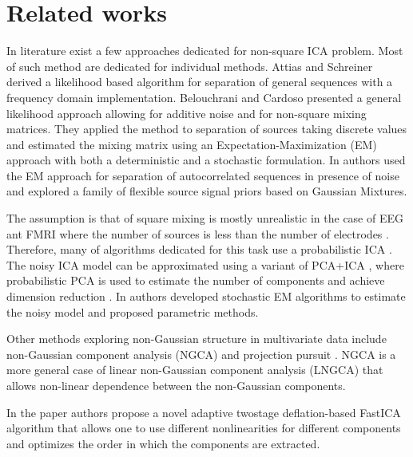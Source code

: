 \section{Related works}
\label{related_works}

In literature exist a few approaches dedicated for non-square ICA problem.
Most of such method are dedicated for individual methods.
Attias and Schreiner \cite{attias1997blind} derived a likelihood based algorithm for separation of general sequences with a frequency domain implementation.
Belouchrani and Cardoso \cite{belouchrani1995maximum} presented a general likelihood approach allowing
for additive noise and for non-square mixing matrices. They applied the
method to separation of sources taking discrete values and estimated the
mixing matrix using an Expectation-Maximization (EM) approach with both a deterministic and a stochastic formulation. In \cite{moulines1997maximum} authors used the EM approach
for separation of autocorrelated sequences in presence of noise and explored
a family of flexible source signal priors based on Gaussian Mixtures. 

The assumption is that of square mixing is mostly unrealistic in  the case of EEG ant FMRI where the number of sources is less than the number of electrodes \cite{beckmann2004probabilistic,samarov2004nonparametric,shi2017investigating}. Therefore, many of algorithms dedicated for this task use a probabilistic ICA \cite{tipping1999probabilistic}.
The noisy ICA model can be approximated using a variant of PCA+ICA \cite{beckmann2004probabilistic}, where probabilistic PCA is used to estimate the number of components and achieve dimension reduction \cite{tipping1999probabilistic}.
In \cite{allassonniere2012stochastic} authors developed stochastic EM algorithms to estimate the noisy model and proposed parametric methods.

Other methods exploring non-Gaussian structure in multivariate data include non-Gaussian component analysis (NGCA) and projection pursuit \cite{blanchard2006search,kawanabe2007new}.
NGCA is a more general case of linear non-Gaussian component analysis (LNGCA) \cite{risk2015likelihood}
that allows non-linear dependence between the non-Gaussian components.

In the paper  \cite{miettinen2014deflation} authors propose a novel adaptive twostage deflation-based FastICA algorithm that allows one to use different nonlinearities for different components and optimizes the order in which the components are extracted.







